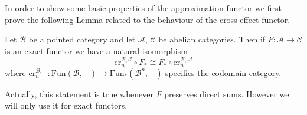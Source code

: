 In order to show some basic properties of the approximation functor we first prove the following Lemma related to the behaviour of the cross effect functor.

\begin{lem}[label=lem:crossNatTrans]
    Let $\mathcal{B}$ be a pointed category and let $\mathcal{A}$, $\mathcal{C}$ be abelian categories. Then if $F:\mathcal{A}\rightarrow \mathcal{C}$ is an exact functor we have a natural isomorphism
    \begin{equation*}
        \text{cr}_n^{\mathcal{B},\mathcal{C}}\circ F_*\cong F_*\circ \text{cr}_n^{\mathcal{B},\mathcal{A}}
    \end{equation*}
    where $\text{cr}_n^{\mathcal{B},-}:\text{Fun}(\mathcal{B},-)\rightarrow \text{Fun}_*(\mathcal{B}^n,-)$ specifies the codomain category.
\end{lem}
Actually, this statement is true whenever $F$ preserves direct sums. However we will only use it for exact functors.

